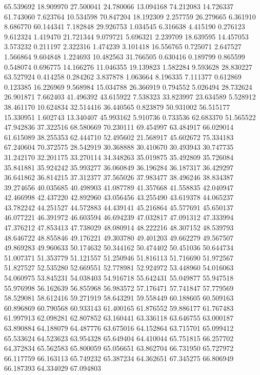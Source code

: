 65.539692
18.909970
27.500041
24.780066
13.094168
74.212083
14.726337
61.743060
7.623764
10.534598
70.847204
18.192309
2.257759
26.279665
6.361910
8.686770
60.144341
7.182848
29.926753
1.034545
6.316638
4.415190
0.276123
9.612324
1.419470
21.721344
9.079721
5.696321
2.239709
18.639595
14.457053
3.573232
0.211197
2.322316
1.474239
3.101418
16.556765
0.725071
2.647527
1.566864
9.604848
1.224693
10.482563
31.766505
0.630416
0.189799
0.865599
0.548074
0.696775
14.166276
11.046355
19.139823
1.582284
9.593628
28.830227
63.527924
0.414258
0.284262
3.837878
1.063664
8.196335
7.111377
0.612869
0.123385
16.226969
9.568984
15.034788
26.366919
0.794552
5.026494
28.732624
26.901871
7.662403
41.496392
43.615922
7.538323
33.823997
23.634589
5.528912
38.461170
10.624834
32.514416
36.440565
0.823879
50.931002
56.515177
15.330951
1.602743
13.340407
45.993162
5.910736
0.733536
62.683370
51.565522
47.942836
37.322516
68.580669
70.230111
69.454997
63.484917
66.029014
61.615089
38.255353
62.444710
52.495602
21.568917
45.602672
75.334183
67.240604
70.372575
28.542919
30.368888
30.410670
30.493943
30.747735
31.242170
32.201175
33.270114
34.348263
35.019875
35.492809
35.726084
35.841881
35.924242
35.993277
36.060849
36.196284
36.187317
36.429297
36.641862
36.814215
37.312377
37.565026
37.983477
38.496246
38.834387
39.274656
40.035685
40.498903
41.087789
41.357668
41.558835
42.040947
42.466998
42.437220
42.892960
43.056456
43.255490
43.619378
44.065237
43.782242
44.251527
44.572883
44.439141
45.216864
45.577691
45.650137
46.077221
46.391972
46.603594
46.694239
47.032817
47.091312
47.333994
47.376212
47.853413
47.738029
48.080914
48.222216
48.307152
48.539793
48.646722
48.855846
49.176221
49.303780
49.401203
49.662279
49.567507
49.869283
49.960633
50.174632
50.344162
50.474402
50.451036
50.644734
51.007371
51.353779
51.121557
51.250946
51.816113
51.716690
51.972567
51.827527
52.535280
52.669551
52.778981
52.924972
53.448960
54.016063
54.060975
53.845231
54.038403
54.916718
55.642431
55.049877
55.947518
55.976998
56.162639
56.855968
56.983572
57.176471
57.741847
57.779569
58.529081
58.612416
59.271919
58.643291
59.558449
60.188605
60.509163
60.896869
60.790568
60.933143
61.400165
61.876552
59.886177
61.767483
61.997913
62.098281
62.807852
63.160441
63.336118
63.646755
63.000187
63.890884
64.188079
64.487776
63.675016
64.152864
63.715701
65.099412
65.533624
64.523623
63.954328
65.649404
64.410044
65.751815
66.257702
64.372834
65.562583
65.800059
65.056651
63.862704
66.731950
65.727972
66.117759
66.163113
65.749232
65.387234
64.362651
67.345275
66.806949
66.187393
64.334029
67.094803
